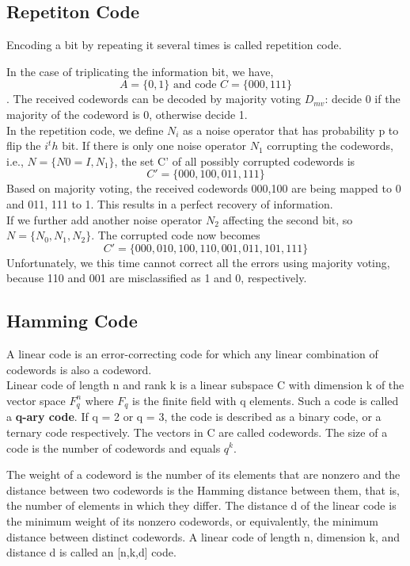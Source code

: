 \documentclass[12pt]{report}
\begin{document}
\subsection{Repetiton Code}
\begin{defn1}Encoding a bit by repeating it several times is called repetition code.\end{defn1}
In the case of triplicating the information bit, we have, 
\begin{equation*}A = \{0, 1\} \text{ and code } C = \{000, 111\}\end{equation*}. 
The received codewords can be decoded by majority voting $D_{mv}$: decide 0 if the majority of the codeword is 0, otherwise decide 1.\\
In the repetition code, we define $N_i$ as a noise operator that has probability p to flip the $i^th$ bit. If there is only one noise operator $N_1$ corrupting the codewords, i.e., $N = \{N0 = I, N_1\}$, the set C' of all possibly corrupted codewords is 
\begin{equation*}C' = \{000, 100, 011, 111\}\end{equation*}
Based on majority voting, the received codewords 000,100 are being mapped to 0 and 011, 111 to 1. This results in a perfect recovery of information. \\
If we further add another noise operator $N_2$ affecting the second bit, so $N = \{N_0, N_1, N_2\}$. The corrupted code now becomes 
\begin{equation*}C' = \{000, 010, 100, 110, 001, 011, 101, 111\}\end{equation*}
Unfortunately, we this time cannot correct all the errors using majority voting, because 110 and 001 are misclassified as 1 and 0, respectively.
\subsection{Hamming Code}
\begin{defn1} A linear code is an error-correcting code for which any linear combination of codewords is also a codeword. \\  Linear code of length n and rank k is a linear subspace C with dimension k of the vector space ${F} _{q}^{n}$ where ${F} _{q}$ is the finite field with q elements. Such a code is called a \textbf{q-ary code}. If q = 2 or q = 3, the code is described as a binary code, or a ternary code respectively. The vectors in C are called codewords. The size of a code is the number of codewords and equals $q^k$.\end{defn1}
The weight of a codeword is the number of its elements that are nonzero and the distance between two codewords is the Hamming distance between them, that is, the number of elements in which they differ. The distance d of the linear code is the minimum weight of its nonzero codewords, or equivalently, the minimum distance between distinct codewords. A linear code of length n, dimension k, and distance d is called an [n,k,d] code.
\end{document}
